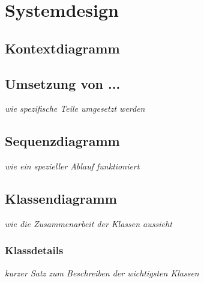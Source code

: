 \section{Systemdesign}
        \subsection{Kontextdiagramm}
		\subsection{Umsetzung von ...}
			\textit{wie spezifische Teile umgesetzt werden}
		\subsection{Sequenzdiagramm}
			\textit{wie ein spezieller Ablauf funktioniert}
		\subsection{Klassendiagramm}
			\textit{wie die Zusammenarbeit der Klassen aussieht}
			\subsubsection{Klassdetails}
				\textit{kurzer Satz zum Beschreiben der wichtigsten Klassen}